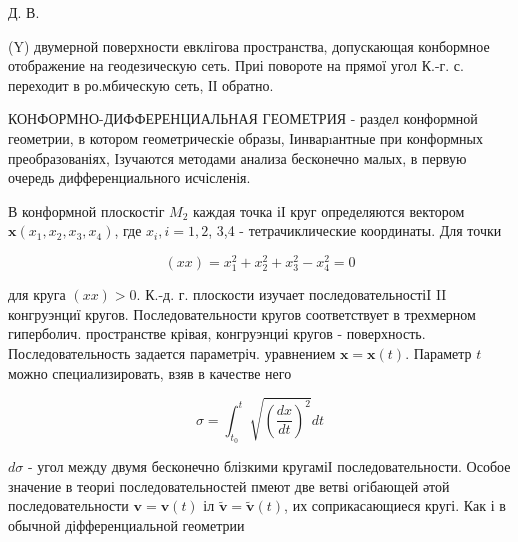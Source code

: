 \documentclass[10pt]{article}
\begin{document}
Д. В.



(Y) двумерной поверхности евклігова пространства, допускающая конбормное отображение на геодезическую сеть. Приі повороте на прямої угол К.-г. с. переходит в ро.мбическую сеть, ІІ обратно.



КОНФОРМНО-ДИФФЕРЕНЦИАЛЬНАЯ ГЕОМЕТРИЯ - раздел конформной геометрии, в котором геометрическіе образы, Іинварıантные при конформных преобразованіях, Ізучаются методами анализа бесконечно малых, в первую очередь дифференциального исчісленія.



В конформной плоскостіг $M_{2}$ каждая точка іІ круг определяются вектором $\boldsymbol{x}\left(x_{1}, x_{2}, x_{3}, x_{4}\right)$, где $x_{i}, i=1,2$, 3,4 - тетрачиклические координаты. Для точки



\[

(x x)=x_{1}^{2}+x_{2}^{2}+x_{3}^{2}-x_{4}^{2}=0

\]



для круга $(x x)>0$. К.-д. г. плоскости изучает последовательностіI II конгруэнциї кругов. Последовательности кругов соответствует в трехмерном гиперболич. пространстве крівая, конгруэнциі кругов - поверхность. Последовательность задается параметріч. уравнением $\boldsymbol{x}=\boldsymbol{x}(t)$. Параметр $t$ можно специализировать, взяв в качестве него



\[

\sigma=\int_{t_{0}}^{t} \sqrt{\left(\frac{d x}{d t}\right)^{2}} d t

\]



$d \sigma$ - угол между двумя бесконечно блізкими кругаміІ последовательности. Особое значение в теориі последовательностей пмеют две ветві огібающей әтой последовательности $\boldsymbol{v}=\boldsymbol{v}(t)$ іл $\tilde{\boldsymbol{v}}=\tilde{\boldsymbol{v}}(t)$, их соприкасающиеся кругі. Как і в обычной діфференциальной геометрии
\end{document}
